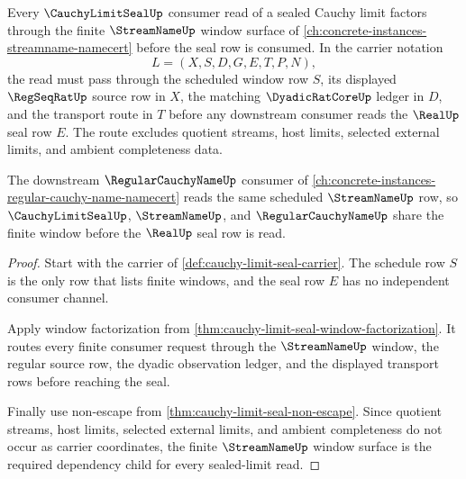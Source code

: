 \begin{theorem}
\label{thm:streamname-cauchy-limit-seal-dependency}
Every $\CauchyLimitSealUp$ consumer read of a sealed Cauchy limit factors through the finite $\StreamNameUp$ window surface of \autoref{ch:concrete-instances-streamname-namecert} before the seal row is consumed. In the carrier notation
$$
L=(X,S,D,G,E,T,P,N),
$$
the read must pass through the scheduled window row $S$, its displayed $\RegSeqRatUp$ source row in $X$, the matching $\DyadicRatCoreUp$ ledger in $D$, and the transport route in $T$ before any downstream consumer reads the $\RealUp$ seal row $E$. The route excludes quotient streams, host limits, selected external limits, and ambient completeness data.

The downstream $\RegularCauchyNameUp$ consumer of \autoref{ch:concrete-instances-regular-cauchy-name-namecert} reads the same scheduled $\StreamNameUp$ row, so $\CauchyLimitSealUp$, $\StreamNameUp$, and $\RegularCauchyNameUp$ share the finite window before the $\RealUp$ seal row is read.
\end{theorem}
\begin{proof}
Start with the carrier of \autoref{def:cauchy-limit-seal-carrier}. The schedule row $S$ is the only row that lists finite windows, and the seal row $E$ has no independent consumer channel.

Apply window factorization from \autoref{thm:cauchy-limit-seal-window-factorization}. It routes every finite consumer request through the $\StreamNameUp$ window, the regular source row, the dyadic observation ledger, and the displayed transport rows before reaching the seal.

Finally use non-escape from \autoref{thm:cauchy-limit-seal-non-escape}. Since quotient streams, host limits, selected external limits, and ambient completeness do not occur as carrier coordinates, the finite $\StreamNameUp$ window surface is the required dependency child for every sealed-limit read.
\end{proof}

